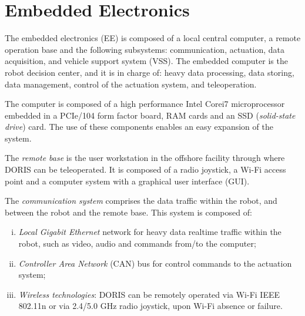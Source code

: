 \documentclass{ifacconf}
\begin{document}


\section{Embedded Electronics}\label{sec:electronics_overview}
The embedded electronics (EE) is composed of a local central computer, a remote
operation base and the following subsystems: communication, actuation, data
acquisition, and vehicle support system (VSS).
The embedded computer is the robot decision center, and it is in charge of:
heavy data processing, data storing, data management, control of the actuation
system, and teleoperation.

The computer is composed of a high performance \linebreak Intel\textregistered
Core\texttrademark i7 microprocessor embedded in a PCIe/104 form factor board,
RAM cards and an SSD (\emph{solid-state drive}) card. The use of these
components enables an easy expansion of the system.

The \emph{remote base} is the user workstation in the offshore
facility through where DORIS can be teleoperated. It is 
composed of a radio joystick, a Wi-Fi access point and a
computer system with a graphical user interface (GUI).

The \emph{communication system} comprises the data traffic within the robot, and
between the robot and the remote base. This system is composed of:

\begin{enumerate}[i)]
\item \emph{Local Gigabit Ethernet} network for heavy data realtime
traffic within the robot, such as video, audio and
commands from/to the computer;
\item \emph{Controller Area Network} (CAN) bus for control commands
to the actuation system;
\item \emph{Wireless technologies}: DORIS can be remotely operated
via Wi-Fi IEEE 802.11n or via 2.4/5.0 GHz radio
joystick, upon Wi-Fi absence or failure.
\end{enumerate}
\end{document}
